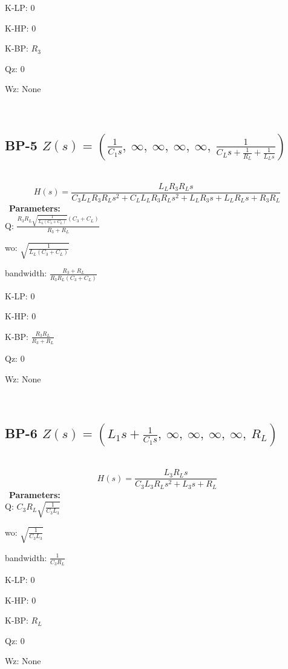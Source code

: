 \documentclass{article}
\begin{document}
K-LP: $0$\ 

K-HP: $0$\ 

K-BP: $R_{3}$\ 

Qz: $0$\ 

Wz: $\text{None}$\ 

\ 

\subsection{BP-5 $Z(s) = \left( \frac{1}{C_{1} s}, \  \infty, \  \infty, \  \infty, \  \infty, \  \frac{1}{C_{L} s + \frac{1}{R_{L}} + \frac{1}{L_{L} s}}\right)$ } \ 
\textbf{\[H(s) = \frac{L_{L} R_{3} R_{L} s}{C_{3} L_{L} R_{3} R_{L} s^{2} + C_{L} L_{L} R_{3} R_{L} s^{2} + L_{L} R_{3} s + L_{L} R_{L} s + R_{3} R_{L}}\] } \ 
\textbf{Parameters:}\\ 

Q: $\frac{R_{3} R_{L} \sqrt{\frac{1}{L_{L} \left(C_{3} + C_{L}\right)}} \left(C_{3} + C_{L}\right)}{R_{3} + R_{L}}$\ 

wo: $\sqrt{\frac{1}{L_{L} \left(C_{3} + C_{L}\right)}}$\ 

bandwidth: $\frac{R_{3} + R_{L}}{R_{3} R_{L} \left(C_{3} + C_{L}\right)}$\ 

K-LP: $0$\ 

K-HP: $0$\ 

K-BP: $\frac{R_{3} R_{L}}{R_{3} + R_{L}}$\ 

Qz: $0$\ 

Wz: $\text{None}$\ 

\ 

\subsection{BP-6 $Z(s) = \left( L_{1} s + \frac{1}{C_{1} s}, \  \infty, \  \infty, \  \infty, \  \infty, \  R_{L}\right)$ } \ 
\textbf{\[H(s) = \frac{L_{3} R_{L} s}{C_{3} L_{3} R_{L} s^{2} + L_{3} s + R_{L}}\] } \ 
\textbf{Parameters:}\\ 

Q: $C_{3} R_{L} \sqrt{\frac{1}{C_{3} L_{3}}}$\ 

wo: $\sqrt{\frac{1}{C_{3} L_{3}}}$\ 

bandwidth: $\frac{1}{C_{3} R_{L}}$\ 

K-LP: $0$\ 

K-HP: $0$\ 

K-BP: $R_{L}$\ 

Qz: $0$\ 

Wz: $\text{None}$\ 
\end{document}
